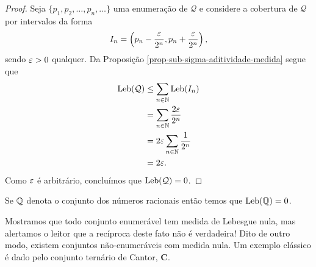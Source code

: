         \begin{proof}
            Seja $\{ p_1, p_2, \dots, p_n, \dots \}$ uma 
            enumeração de $\mathcal{Q}$ e considere
            a cobertura de $\mathcal{Q}$ por intervalos da forma
            \begin{equation*}
                I_n = \left(p_n - \frac{\varepsilon}{2^n}, p_n + \frac{\varepsilon}{2^n} \right),
            \end{equation*}
            sendo $\varepsilon>0$ qualquer. 
            Da Proposição \ref{prop-sub-sigma-aditividade-medida} segue que
            \begin{align*}
                \mathrm{Leb}(\mathcal{Q}) &\leq \sum_{n\in\mathbb{N}} \mathrm{Leb}(I_n) \\
                                  &= \sum_{n\in\mathbb{N}} \frac{2\varepsilon}{2^n} \\
                                  &= 2\varepsilon\sum_{n\in\mathbb{N}} \frac{1}{2^n} \\
                                  &= 2\varepsilon.
            \end{align*}
            Como $\varepsilon$ é arbitrário, concluímos que $\mathrm{Leb}(\mathcal{Q}) = 0$.
        \end{proof}
        \begin{corolario}
            Se $\mathbb{Q}$ denota o conjunto dos números racionais então temos que 
            $\mathrm{Leb}(\mathbb{Q}) = 0$.
        \end{corolario}
        Mostramos que todo conjunto enumerável tem medida de Lebesgue nula, 
        mas alertamos o leitor que a recíproca deste fato não é verdadeira! 
        Dito de outro modo, existem conjuntos não-enumeráveis com medida nula.
        Um exemplo clássico é dado pelo conjunto ternário de Cantor, $\mathbf{C}$.
        
